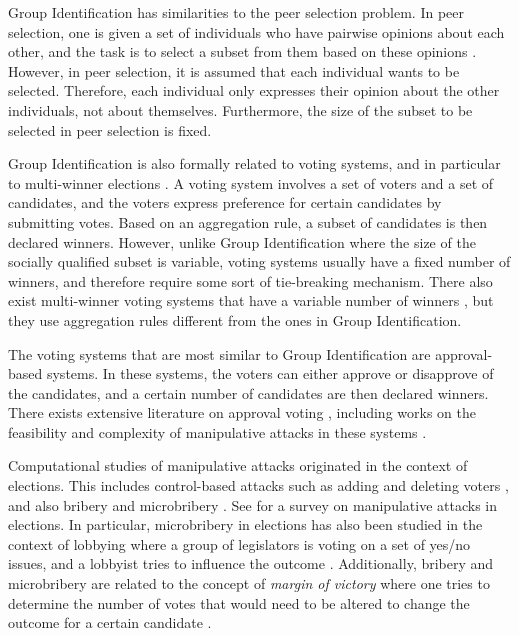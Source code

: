 \documentclass[
    12pt,               %
    a4paper,            %
    bibtotoc,           %
    pointlessnumbers,   %
    ngerman,            %
    titlepage,          %
    leqno,              %
    ]{scrarticle}       %
\begin{document}
Group Identification has similarities to the peer selection problem. In peer selection, one is given a set of individuals who have pairwise opinions about each other, and the task is to select a subset from them based on these opinions \cite{AFPT11,ALMRW16}. However, in peer selection, it is assumed that each individual wants to be selected. Therefore, each individual only expresses their opinion about the other individuals, not about themselves. Furthermore, the size of the subset to be selected in peer selection is fixed.

Group Identification is also formally related to voting systems, and in particular to multi-winner elections \cite{FSST17,EFSS17}. A voting system involves a set of voters and a set of candidates, and the voters express preference for certain candidates by submitting votes. Based on an aggregation rule, a subset of candidates is then declared winners. However, unlike Group Identification where the size of the socially qualified subset is variable, voting systems usually have a fixed number of winners, and therefore require some sort of tie-breaking mechanism. There also exist multi-winner voting systems that have a variable number of winners \cite{BBMN04,K16,FST20,YW18,DPZ16,LM21}, but they use aggregation rules different from the ones in Group Identification.

The voting systems that are most similar to Group Identification are approval-based systems. In these systems, the voters can either approve or disapprove of the candidates, and a certain number of candidates are then declared winners. There exists extensive literature on approval voting \cite{BEHHR10,FB81,LS10}, including works on the feasibility and complexity of manipulative attacks in these systems \cite{HHR07,L11,YG17,Y19,Y20,BFNT21,BKN21}.

Computational studies of manipulative attacks originated in the context of elections. This includes control-based attacks such as adding and deleting voters \cite{BTT92,MPRZ08,YG14,YG15}, and also bribery and microbribery \cite{FHH09,FHHR09}. See \textcite{FR16} for a survey on manipulative attacks in elections. In particular, microbribery in elections has also been studied in the context of lobbying where a group of legislators is voting on a set of yes/no issues, and a lobbyist tries to influence the outcome \cite{BEFGMR14,CFRS07}. Additionally, bribery and microbribery are related to the concept of \emph{margin of victory} where one tries to determine the number of votes that would need to be altered to change the outcome for a certain candidate \cite{C11,MRSW11,BBFN21,FST17,X12}.
\end{document}
